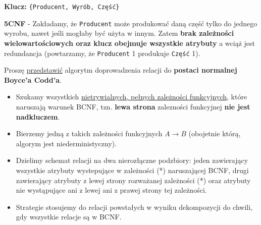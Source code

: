 \vskip 0.5cm

\textbf{Klucz:} \texttt{\{Producent, Wyrób, Część\}}\\

\begin{tcolorbox}
    \textbf{5CNF} - Zakładamy, że \texttt{Producent} może produkować daną część
    tylko do jednego wyrobu, nawet jeśli mogłaby być użyta w innym. Zatem
    \textbf{brak zależności wielowartościowych oraz klucz obejmuje wszystkie
    atrybuty} a wciąż jest redundancja (powtarzamy, że \texttt{Producent} 1
    produkuje \texttt{Część} 1).
\end{tcolorbox}


\horrule{0.5pt}
Proszę \underline{przedstawić} algorytm doprowadzenia relacji do
\textbf{postaci normalnej Boyce’a Codd’a}.\\
\horrule{0.5pt}

\begin{itemize}
    \item Szukamy wszystkich \underline{nietrywialnych, pełnych zależności
    funkcyjnych}, które naruszają warunek BCNF, tzn.
    \textbf{lewa strona} zalezności funkcyjnej
    \textbf{nie jest nadkluczem}.
    \item Bierzemy jedną z takich zależności funkcyjnych $A \rightarrow B$
    (obojetnie którą, algorym jest niederministyczny).
    \item Dzielimy schemat relacji na dwa nierozłączne podzbiory:
    jeden zawierający wszystkie atrybuty wystepujące w zależności (*)
    naruszającej BCNF,
    drugi zawierający atrybuty z lewej strony rozważanej zależności
    (*) oraz atrybuty nie wystąpujące ani z lewej ani z prawej strony
    tej zależności.
    \item Strategie stosujemy do relacji powstałych w wyniku dekompozycji
    do chwili, gdy wszystkie relacje są w BCNF.
\end{itemize}
